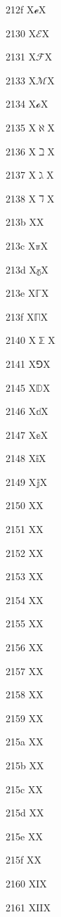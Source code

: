 \documentclass[11pt]{article}
\begin{document}
212f X{\ensuremath{\mathscr{e}}}X

2130 X{\ensuremath{\mathscr{E}}}X

2131 X{\ensuremath{\mathscr{F}}}X

2133 X{\ensuremath{\mathscr{M}}}X

2134 X{\ensuremath{\mathscr{o}}}X

2135 X{\ensuremath{\aleph}}X

2136 X{\ensuremath{\beth}}X

2137 X{\ensuremath{\gimel}}X

2138 X{\ensuremath{\daleth}}X

213b X{\fax}X

213c X{\ensuremath{\mathbb{\pi}}}X

213d X{\ensuremath{\mathbb{\gamma}}}X

213e X{\ensuremath{\mathbb{\Gamma}}}X

213f X{\ensuremath{\mathbb{\Pi}}}X

2140 X{\ensuremath{\mathbb{\sum}}}X

2141 X{\ensuremath{\Game}}X

2145 X{\ensuremath{\mathbb{D}}}X

2146 X{\ensuremath{\mathbb{d}}}X

2147 X{\ensuremath{\mathbb{e}}}X

2148 X{\ensuremath{\mathbb{i}}}X

2149 X{\ensuremath{\mathbb{j}}}X

2150 X{}X

2151 X{}X

2152 X{}X

2153 X{}X

2154 X{}X

2155 X{}X

2156 X{}X

2157 X{}X

2158 X{}X

2159 X{}X

215a X{}X

215b X{}X

215c X{}X

215d X{}X

215e X{}X

215f X{}X

2160 X{I}X

2161 X{II}X
\end{document}
